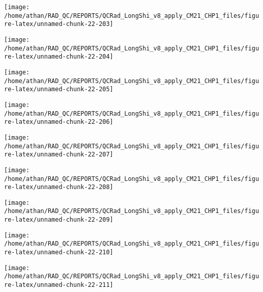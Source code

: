 \documentclass[
  10pt,
  a4paper,oneside]{article}
\begin{document}
\begin{center}\texttt{[image: /home/athan/RAD\_QC/REPORTS/QCRad\_LongShi\_v8\_apply\_CM21\_CHP1\_files/figure-latex/unnamed-chunk-22-203]} \end{center}

\begin{center}\texttt{[image: /home/athan/RAD\_QC/REPORTS/QCRad\_LongShi\_v8\_apply\_CM21\_CHP1\_files/figure-latex/unnamed-chunk-22-204]} \end{center}

\begin{center}\texttt{[image: /home/athan/RAD\_QC/REPORTS/QCRad\_LongShi\_v8\_apply\_CM21\_CHP1\_files/figure-latex/unnamed-chunk-22-205]} \end{center}

\begin{center}\texttt{[image: /home/athan/RAD\_QC/REPORTS/QCRad\_LongShi\_v8\_apply\_CM21\_CHP1\_files/figure-latex/unnamed-chunk-22-206]} \end{center}

\begin{center}\texttt{[image: /home/athan/RAD\_QC/REPORTS/QCRad\_LongShi\_v8\_apply\_CM21\_CHP1\_files/figure-latex/unnamed-chunk-22-207]} \end{center}

\begin{center}\texttt{[image: /home/athan/RAD\_QC/REPORTS/QCRad\_LongShi\_v8\_apply\_CM21\_CHP1\_files/figure-latex/unnamed-chunk-22-208]} \end{center}

\begin{center}\texttt{[image: /home/athan/RAD\_QC/REPORTS/QCRad\_LongShi\_v8\_apply\_CM21\_CHP1\_files/figure-latex/unnamed-chunk-22-209]} \end{center}

\begin{center}\texttt{[image: /home/athan/RAD\_QC/REPORTS/QCRad\_LongShi\_v8\_apply\_CM21\_CHP1\_files/figure-latex/unnamed-chunk-22-210]} \end{center}

\begin{center}\texttt{[image: /home/athan/RAD\_QC/REPORTS/QCRad\_LongShi\_v8\_apply\_CM21\_CHP1\_files/figure-latex/unnamed-chunk-22-211]} \end{center}
\end{document}
